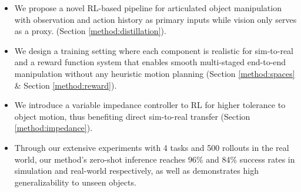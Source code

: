 \begin{itemize}

\item We propose a novel RL-based pipeline for articulated object manipulation with observation and action history as primary inputs while vision only serves as a proxy. (Section \ref{method:distillation}).

\item We design a training setting where each component is realistic for sim-to-real and a reward function system that enables smooth multi-staged end-to-end manipulation without any heuristic motion planning (Section \ref{method:spaces} \& Section \ref{method:reward}).

\item We introduce a variable impedance controller to RL for higher tolerance to object motion, thus benefiting direct sim-to-real transfer (Section \ref{method:impedance}).

\item Through our extensive experiments with 4 tasks and 500 rollouts in the real world, our method's zero-shot inference reaches 96\% and 84\% success rates in simulation and real-world respectively, as well as demonstrates high generalizability to unseen objects.

\end{itemize}

